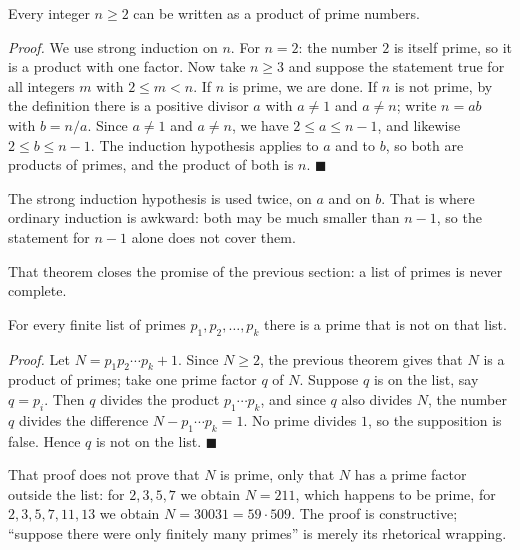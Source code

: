 \begin{teorema}
Every integer $n \geq 2$ can be written as a product of prime
numbers.
\end{teorema}
\par\smallskip\noindent\textit{Proof.} We use strong induction on $n$. For $n = 2$:
the number $2$ is itself prime, so it is a product with one factor. Now take
$n \geq 3$ and suppose the statement true for all integers $m$ with
$2 \leq m < n$. If $n$ is prime, we are done. If $n$ is not prime, by the definition there is a
positive divisor $a$ with $a \neq 1$ and $a \neq n$; write $n = ab$ with
$b = n/a$. Since $a \neq 1$ and $a \neq n$, we have $2 \leq a \leq n-1$, and likewise
$2 \leq b \leq n-1$. The induction hypothesis applies to $a$ and to $b$, so both are
products of primes, and the product of both is $n$.
\hfill$\blacksquare${\parfillskip=0pt\par}

The strong induction hypothesis is used twice, on $a$ and on $b$. That is where ordinary induction
is awkward: both may be much smaller than $n-1$, so the statement for
$n-1$ alone does not cover them.

That theorem closes the promise of the previous section: a list of primes is never complete.

\begin{akibat}
For every finite list of primes $p_{1}, p_{2}, \dots, p_{k}$ there is
a prime that is not on that list.
\end{akibat}
\par\smallskip\noindent\textit{Proof.} Let $N = p_{1}p_{2}\cdots p_{k} + 1$. Since
$N \geq 2$, the previous theorem gives that $N$ is a product of primes;
take one prime factor $q$ of $N$. Suppose $q$ is on the list, say
$q = p_{i}$. Then $q$ divides the product $p_{1}\cdots p_{k}$, and since $q$ also
divides $N$, the number $q$ divides the difference $N - p_{1}\cdots p_{k} = 1$. No
prime divides $1$, so the supposition is false. Hence $q$ is not on
the list.
\hfill$\blacksquare${\parfillskip=0pt\par}

That proof does not prove that $N$ is prime, only that $N$ has a prime factor outside the
list: for $2,3,5,7$ we obtain $N = 211$, which happens to be prime, for $2,3,5,7,11,13$
we obtain $N = 30031 = 59 \cdot 509$. The proof is constructive; ``suppose there were only
finitely many primes'' is merely its rhetorical wrapping.

